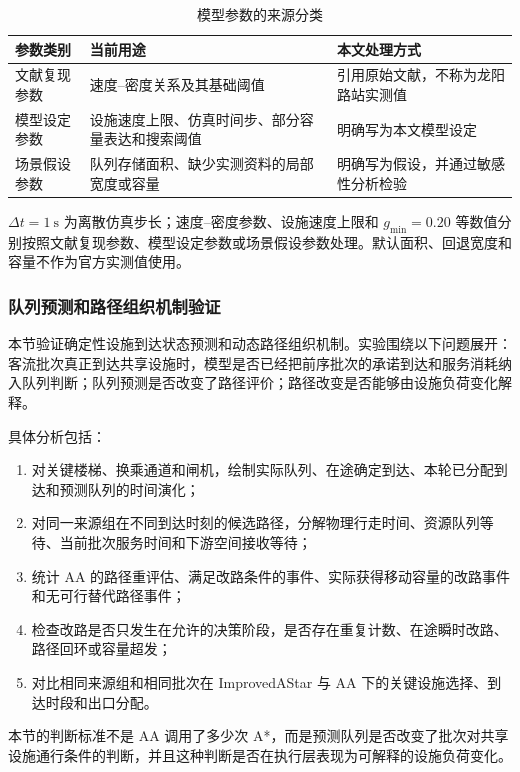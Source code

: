 \documentclass[UTF8,a4paper,12pt]{ctexart}
\begin{document}
\begin{table}[htbp]
\centering
\caption{模型参数的来源分类}
\begin{tabular}{p{}p{}p{}}
\toprule
参数类别 & 当前用途 & 本文处理方式 \\
\midrule
文献复现参数 & 速度--密度关系及其基础阈值 & 引用原始文献，不称为龙阳路站实测值 \\
模型设定参数 & 设施速度上限、仿真时间步、部分容量表达和搜索阈值 & 明确写为本文模型设定 \\
场景假设参数 & 队列存储面积、缺少实测资料的局部宽度或容量 & 明确写为假设，并通过敏感性分析检验 \\
\bottomrule
\end{tabular}
\end{table}

\(\Delta t=1\ \mathrm{s}\) 为离散仿真步长；速度--密度参数、设施速度上限和 \(g_{\min}=0.20\) 等数值分别按照文献复现参数、模型设定参数或场景假设参数处理。默认面积、回退宽度和容量不作为官方实测值使用。

\subsubsection{队列预测和路径组织机制验证}

本节验证确定性设施到达状态预测和动态路径组织机制。实验围绕以下问题展开：客流批次真正到达共享设施时，模型是否已经把前序批次的承诺到达和服务消耗纳入队列判断；队列预测是否改变了路径评价；路径改变是否能够由设施负荷变化解释。

具体分析包括：
\begin{enumerate}
    \item 对关键楼梯、换乘通道和闸机，绘制实际队列、在途确定到达、本轮已分配到达和预测队列的时间演化；
    \item 对同一来源组在不同到达时刻的候选路径，分解物理行走时间、资源队列等待、当前批次服务时间和下游空间接收等待；
    \item 统计 AA 的路径重评估、满足改路条件的事件、实际获得移动容量的改路事件和无可行替代路径事件；
    \item 检查改路是否只发生在允许的决策阶段，是否存在重复计数、在途瞬时改路、路径回环或容量超发；
    \item 对比相同来源组和相同批次在 ImprovedAStar 与 AA 下的关键设施选择、到达时段和出口分配。
\end{enumerate}

本节的判断标准不是 AA 调用了多少次 A*，而是预测队列是否改变了批次对共享设施通行条件的判断，并且这种判断是否在执行层表现为可解释的设施负荷变化。
\end{document}
